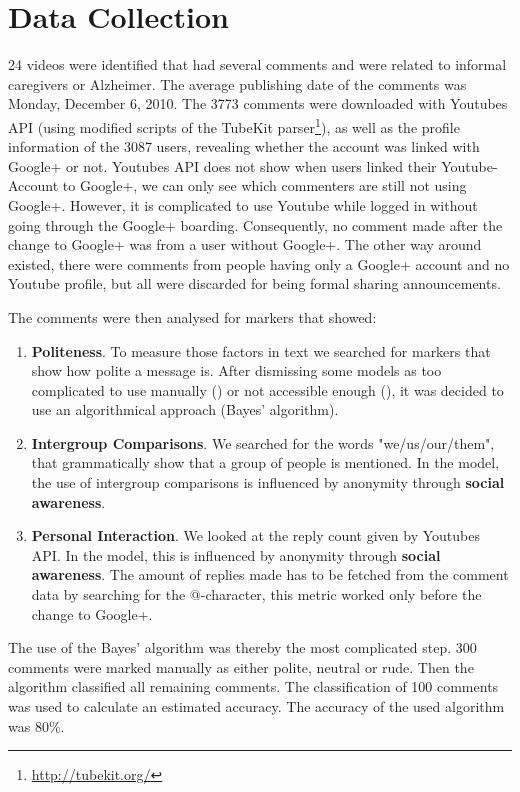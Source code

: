 \documentclass{chi-ext2}
\begin{document}
\section{Data Collection}
24 videos were identified that had several comments and were related to informal caregivers or Alzheimer. The average publishing date of the comments was Monday, December 6, 2010. The 3773 comments were downloaded with Youtubes API (using modified scripts of the TubeKit parser\footnote{\url{http://tubekit.org/}}), as well as the profile information of the 3087 users, revealing whether the account was linked with Google+ or not. Youtubes API does not show when users linked their Youtube-Account to Google+, we can only see which commenters are still not using Google+. However, it is complicated to use Youtube while logged in without going through the Google+ boarding. Consequently, no comment made after the change to Google+ was from a user without Google+. The other way around existed, there were comments from people having only a Google+ account and no Youtube profile, but all were discarded for being formal sharing announcements.

The comments were then analysed for markers that showed: 
\begin{enumerate}
\item \textbf{Politeness}. To measure those factors in text we searched for markers that show how polite a message is. After dismissing some models as too complicated to use manually (\cite{politenessMarkers}) or not accessible enough (\cite{computationalPoliteness}), it was decided to use an algorithmical approach (Bayes' algorithm). 
\item \textbf{Intergroup Comparisons}. We searched for the words "we/us/our/them", that grammatically show that a group of people is mentioned. In the model, the use of intergroup comparisons is influenced by anonymity through \textbf{social awareness}.
\item \textbf{Personal Interaction}. We looked at the reply count given by Youtubes API. In the model, this is influenced by anonymity through \textbf{social awareness}. The amount of replies made has to be fetched from the comment data by searching for the @-character, this metric worked only before the change to Google+.
\end{enumerate}

The use of the Bayes' algorithm was thereby the most complicated step. 300 comments were marked manually as either polite, neutral or rude. Then the algorithm classified all remaining comments. The classification of 100 comments was used to calculate an estimated accuracy. The accuracy of the used algorithm was 80\%.
\end{document}
